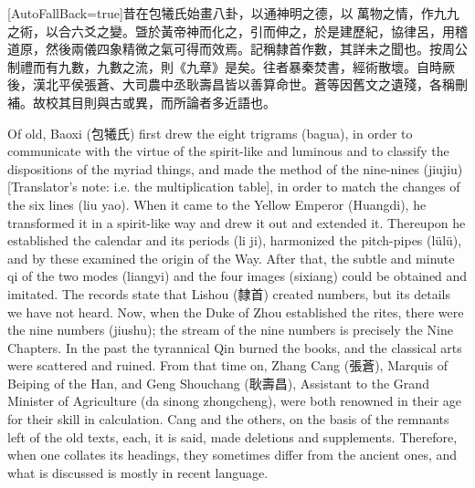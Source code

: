 \documentclass[11pt]{article}
\newcommand{\unitlabel}[1]{\marginpar{\raggedleft\tiny\color{gray}#1}}
\newenvironment{unitzh}{\par\CJKfontspec{Noto Serif CJK SC}[AutoFallBack=true]\large\linespread{1.25}\selectfont}{\par}
\newenvironment{uniten}{\par\small\color{black!85}}{\par\medskip}
\begin{document}
\begin{unitzh}\unitlabel{jiuzhang-001.2}昔在包犧氏始畫八卦，以通神明之德，以𩔖萬物之情，作九九之術，以合六爻之變。曁於黃帝神而化之，引而伸之，於是建歷紀，協律呂，用稽道原，然後兩儀四象精微之氣可得而效焉。記稱隸首作數，其詳未之聞也。按周公制禮而有九數，九數之流，則《九章》是矣。往者暴秦焚書，經術散壞。自時厥後，漢北平侯張蒼、大司農中丞耿壽昌皆以善算命世。蒼等因舊文之遺殘，各稱刪補。故校其目則與古或異，而所論者多近語也。\end{unitzh}
\begin{uniten}Of old, Baoxi (包犧氏) first drew the eight trigrams (bagua), in order to communicate with the virtue of the spirit-like and luminous and to classify the dispositions of the myriad things, and made the method of the nine-nines (jiujiu) [Translator's note: i.e. the multiplication table], in order to match the changes of the six lines (liu yao). When it came to the Yellow Emperor (Huangdi), he transformed it in a spirit-like way and drew it out and extended it. Thereupon he established the calendar and its periods (li ji), harmonized the pitch-pipes (lülü), and by these examined the origin of the Way. After that, the subtle and minute qi of the two modes (liangyi) and the four images (sixiang) could be obtained and imitated. The records state that Lishou (隸首) created numbers, but its details we have not heard. Now, when the Duke of Zhou established the rites, there were the nine numbers (jiushu); the stream of the nine numbers is precisely the Nine Chapters. In the past the tyrannical Qin burned the books, and the classical arts were scattered and ruined. From that time on, Zhang Cang (張蒼), Marquis of Beiping of the Han, and Geng Shouchang (耿壽昌), Assistant to the Grand Minister of Agriculture (da sinong zhongcheng), were both renowned in their age for their skill in calculation. Cang and the others, on the basis of the remnants left of the old texts, each, it is said, made deletions and supplements. Therefore, when one collates its headings, they sometimes differ from the ancient ones, and what is discussed is mostly in recent language.\end{uniten}
\end{document}
